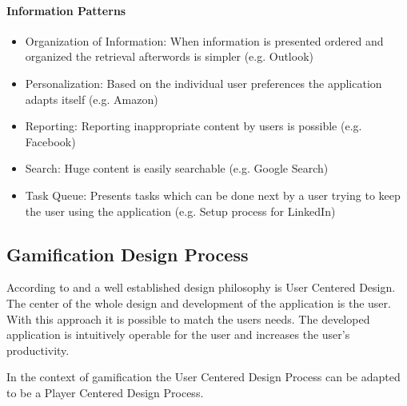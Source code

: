\paragraph*{Information Patterns}
\begin{itemize}
	\item Organization of Information: When information is presented ordered and organized the retrieval afterwords is simpler (e.g. Outlook) \cite[p. 6, 85, 86]{lewisIrresistibleAppsMotivational2014}
	\item Personalization: Based on the individual user preferences the application adapts itself (e.g. Amazon) \cite[p. 6, 87]{lewisIrresistibleAppsMotivational2014}
	\item Reporting: Reporting inappropriate content by users is possible (e.g. Facebook) \cite[p. 6, 90]{lewisIrresistibleAppsMotivational2014}
	\item Search: Huge content is easily searchable (e.g. Google Search) \cite[p. 6, 90, 91]{lewisIrresistibleAppsMotivational2014}
	\item Task Queue: Presents tasks which can be done next by a user trying to keep the user using the application (e.g. Setup process for LinkedIn) \cite[p. 6, 93]{lewisIrresistibleAppsMotivational2014}
\end{itemize}

\newpage

\subsection{Gamification Design Process}
\label{sec:theoryBd}

According to \cite[p. 5, 6]{lowdermilkUsercenteredDesignDevelopers2013} and \cite[p. 27, 28]{kumarGamificationWorkDesigning2013} a well established design philosophy is User Centered Design. The center of the whole design and development of the application is the user. With this approach it is possible to match the users needs. The developed application is intuitively operable for the user and increases the user's productivity.

In the context of gamification the User Centered Design Process can be adapted to be a Player Centered Design Process.  

